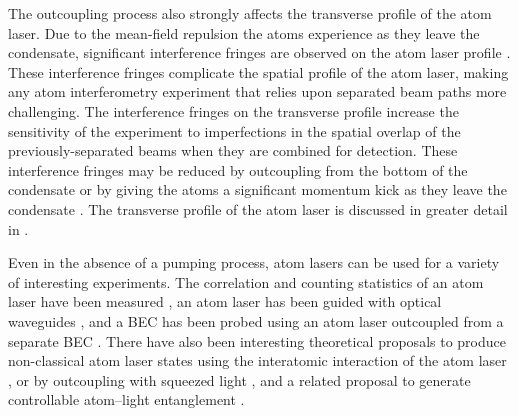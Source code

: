 The outcoupling process also strongly affects the transverse profile of the atom laser.  Due to the mean-field repulsion the atoms experience as they leave the condensate, significant interference fringes are observed on the atom laser profile \citep{Busch:2002zr,Kohl:2005fk}.  These interference fringes complicate the spatial profile of the atom laser, making any atom interferometry experiment that relies upon separated beam paths more challenging.  The interference fringes on the transverse profile increase the sensitivity of the experiment to imperfections in the spatial overlap of the previously-separated beams when they are combined for detection.  These interference fringes may be reduced by outcoupling from the bottom of the condensate \citep{Riou:2006uq} or by giving the atoms a significant momentum kick as they leave the condensate \citep{Jeppesen:2008}.  The transverse profile of the atom laser is discussed in greater detail in .

Even in the absence of a pumping process, atom lasers can be used for a variety of interesting experiments.  The correlation and counting statistics of an atom laser have been measured \citep{Ottl:2005}, an atom laser has been guided with optical waveguides \citep{Guerin:2006mz}, and a BEC has been probed using an atom laser outcoupled from a separate BEC \citep{Doring:2008}.  There have also been interesting theoretical proposals to produce non-classical atom laser states using the interatomic interaction of the atom laser \citep{Johnsson:2007b}, or by outcoupling with squeezed light \citep{Haine:2005}, and a related proposal to generate controllable atom--light entanglement \citep{Haine:2006}.

% 
% 

